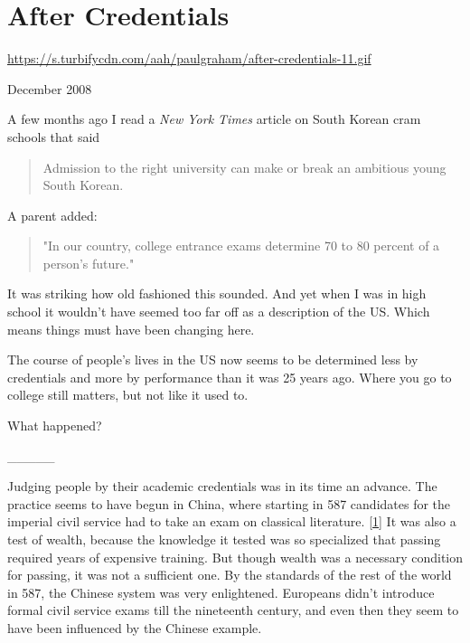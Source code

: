 \chapter{After Credentials}


            
              
                \href{https://s.turbifycdn.com/aah/paulgraham/after-credentials-11.gif}{https://s.turbifycdn.com/aah/paulgraham/after-credentials-11.gif}



December 2008

A few months ago I read a
                  \emph{New York Times} article on South Korean cram schools
                  that said
                  \begin{quote}

                    Admission to the right university can make or break an
                    ambitious young South Korean.
                  
\end{quote}

                  A parent added:
                  \begin{quote}

                    "In our country, college entrance exams determine 70 to 80
                    percent of a person's future."
                  
\end{quote}

                  It was striking how old fashioned this sounded. And yet when I
                  was in high school it wouldn't have seemed too far off as a
                  description of the US. Which means things must have been
                  changing here.

The course of people's lives in the
                  US now seems to be determined less by credentials and more by
                  performance than it was 25 years ago. Where you go to college
                  still matters, but not like it used to.

What
                  happened?


                  \_\_\_\_\_
                  

Judging people by their academic credentials was
                  in its time an advance. The practice seems to have begun in
                  China, where starting in 587 candidates for the imperial civil
                  service had to take an exam on classical literature.
                  [\href{\#f1n}{1}]
                  It was also a test of wealth, because the knowledge it tested
                  was so specialized that passing required years of expensive
                  training. But though wealth was a necessary condition for
                  passing, it was not a sufficient one. By the standards of the
                  rest of the world in 587, the Chinese system was very
                  enlightened. Europeans didn't introduce formal civil service
                  exams till the nineteenth century, and even then they seem to
                  have been influenced by the Chinese example.

